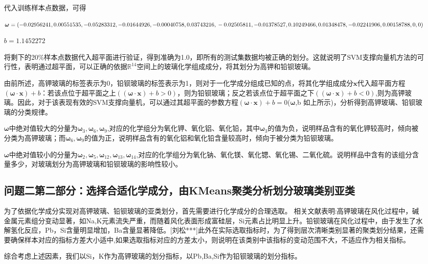 \documentclass[withoutpreface,bwprint]{cumcmthesis}
\newcommand{\R}{\mathbb{R}}
\begin{document}
代入训练样本点数据，可得

$\bm{\omega} =(-0.02956241,0.00551535,-0.05283312,-0.01644926,-0.00040758,0.03743216,\\-0.02505811,-0.01378527,0.10249466,0.01348478,-0.02241906,0.00158788,0,0)$

$b=1.1452272$

将剩下的20\%样本点数据代入超平面进行验证，得到准确为1.0，即所有的测试集数据均被正确的划分。这就说明了SVM支撑向量机方法的可行性，表明通过超平面，可以正确的依据$\R^{14}$空间上的玻璃化学组成成分，将其划分为高钾和铅钡玻璃。

由前所述，高钾玻璃的标签表示为0，铅钡玻璃的标签表示为1，则对于一化学成分组成已知的点，将其化学组成成分${\bm{x}}$代入超平面方程${(\bm{\omega} \cdot \bm{x})+b}$：若该点位于超平面之上${((\bm{\omega} \cdot \bm{x})+b >0)}$，则为铅钡玻璃；反之若该点位于超平面之下${((\bm{\omega} \cdot \bm{x})+b<0)}$,则为高钾玻璃。因此，对于该表现有效的SVM支撑向量机，可以通过其超平面的参数方程${(\bm{\omega} \cdot \bm{x})+b=0}$(${\bm{\omega}}$,b 如上所示)，分析得到高钾玻璃、铅钡玻璃的分类规律。

${\bm{\omega}}$中绝对值较大的分量为${\bm{\omega}_3,\bm{\omega}_6,\bm{\omega}_9}$,对应的化学组分为氧化钾、氧化铝、氧化铅，其中${\bm{\omega}_3}$的值为负，说明样品含有的氧化钾较高时，倾向被分类为高钾玻璃；而${\bm{\omega}_6,\bm{\omega}_9}$的值为正，说明样品含有的氧化铝和氧化铅含量较高时，倾向于被分类为铅钡玻璃。

${\bm{\omega}}$中绝对值较小的分量为${\bm{\omega}_2,\bm{\omega}_5,\bm{\omega}_{12},\bm{\omega}_{13},\bm{\omega}_{14}}$,对应的化学组分为氧化钠、氧化镁、氧化锶、氧化锡、二氧化硫。说明样品中含有的该组分含量多少，对玻璃划分为高钾玻璃和铅钡玻璃的影响性较小。


\subsection{问题二第二部分：选择合适化学成分，由KMeans聚类分析划分玻璃类别亚类}
为了依据化学成分实现对高钾玻璃、铅钡玻璃的亚类划分，首先需要进行化学成分的合理选取。
相关文献表明:高钾玻璃在风化过程中，碱金属元素组分变动显著，如Na,K元素流失严重，而随着风化表面形成富硅层，Si元素占比明显上升。铅钡玻璃在风化过程中，由于发生了水解氢化反应，Pb，Si含量明显增加，Ba含量显著降低。[刘松***]此外在实际选取指标时，为了得到层次清晰类别显著的聚类划分结果，还需要确保样本对应的指标方差大小适中,如果选取指标对应的方差太小，则说明在该类别中该指标的变动范围不大，不适应作为相关指标。

综合考虑上述因素，我们以Si，K作为高钾玻璃的划分指标，以Pb,Ba,Si作为铅钡玻璃的划分指标。
\end{document}
